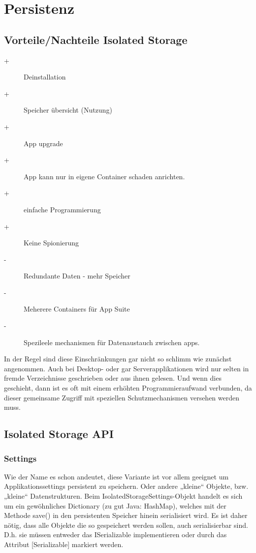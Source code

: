 \documentclass[a4paper,10pt]{scrreprt}
\begin{document}
\chapter{Persistenz}

\section{Vorteile/Nachteile Isolated Storage}

\begin{description}
 \item [+] Deinstallation
 \item[+] Speicher übersicht (Nutzung)
 \item[+] App upgrade
 \item[+] App kann nur in eigene Container schaden anrichten.
 \item[+] einfache Programmierung
 \item[+] Keine Spionierung
 \item[-] Redundante Daten - mehr Speicher
 \item[-] Meherere Containers für App Suite
 \item[-] Spezileele mechanismen für Datenaustauch zwischen apps.
\end{description}

In der Regel sind diese Einschränkungen gar nicht so schlimm wie zunächst angenommen. Auch bei Desktop-
oder gar Serverapplikationen wird nur selten in fremde Verzeichnisse geschrieben oder aus ihnen gelesen. Und
wenn dies geschieht, dann ist es oft mit einem erhöhten Programmieraufwand verbunden, da dieser
gemeinsame Zugriff mit speziellen Schutzmechanismen versehen werden muss.


\section{Isolated Storage API}

\subsection{Settings}
Wie der Name es schon andeutet, diese Variante ist vor allem geeignet um Applikationssettings persistent zu
speichern. Oder andere „kleine“ Objekte, bzw. „kleine“ Datenstrukturen. Beim IsolatedStorageSettings-Objekt
handelt es sich um ein gewöhnliches Dictionary (zu gut Java: HashMap), welches mit der Methode save() in den
persistenten Speicher hinein serialisiert wird. Es ist daher nötig, dass alle Objekte die so gespeichert werden
sollen, auch serialisierbar sind. D.h. sie müssen entweder das ISerializable implementieren oder durch
das Attribut [Serializable] markiert werden.
\end{document}
